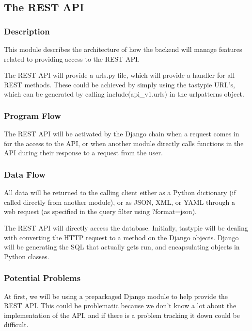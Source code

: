 
\subsection{The REST API}

\subsubsection{Description}

This module describes the architecture of how the backend will manage features related to providing access to the REST API.

The REST API will provide a urls.py file, which will provide a handler for all REST methods.
These could be achieved by simply using the tastypie URL's, which can be generated by calling include(api\_v1.urls) in the urlpatterns object.

\subsubsection{Program Flow}

The REST API will be activated by the Django chain when a request comes in for the access to the API, or when another module directly calls functions in the API during their response to a request from the user.

\subsubsection{Data Flow}

All data will be returned to the calling client either as a Python dictionary (if called directly from another module), or as JSON, XML, or YAML through a web request (as specified in the query filter using ?format=json).

The REST API will directly access the database.
Initially, tastypie will be dealing with converting the HTTP request to a method on the Django objects.
Django will be generating the SQL that actually gets run, and encapsulating objects in Python classes.


\subsubsection{Potential Problems}

At first, we will be using a prepackaged Django module to help provide the REST API.
This could be problematic because we don't know a lot about the implementation of the API, and if there is a problem tracking it down could be difficult.


